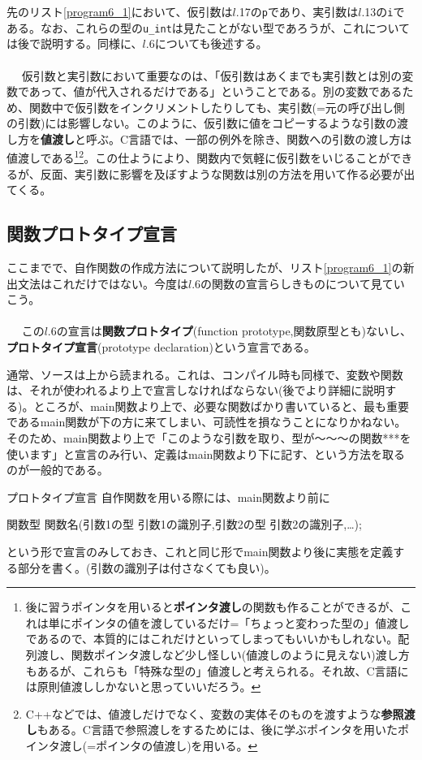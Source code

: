 先のリスト\ref{program6_1}において、仮引数は$l$.17の\verb|p|であり、実引数は$l$.13の\verb|i|である。なお、これらの型の\verb|u_int|は見たことがない型であろうが、これについては後で説明する。同様に、$l$.6についても後述する。
\\ \\　
仮引数と実引数において重要なのは、「仮引数はあくまでも実引数とは別の変数であって、値が代入されるだけである」ということである。別の変数であるため、関数中で仮引数をインクリメントしたりしても、実引数(=元の呼び出し側の引数)には影響しない。このように、仮引数に値をコピーするような引数の渡し方を\textbf{値渡し}と呼ぶ。C言語では、一部の例外を除き、関数への引数の渡し方は値渡しである\footnote{後に習うポインタを用いると\textbf{ポインタ渡し}の関数も作ることができるが、これは単にポインタの値を渡しているだけ=「ちょっと変わった型の」値渡しであるので、本質的にはこれだけといってしまってもいいかもしれない。配列渡し、関数ポインタ渡しなど少し怪しい(値渡しのように見えない)渡し方もあるが、これらも「特殊な型の」値渡しと考えられる。それ故、C言語には原則値渡ししかないと思っていいだろう。}\footnote{C++などでは、値渡しだけでなく、変数の実体そのものを渡すような\textbf{参照渡し}もある。C言語で参照渡しをするためには、後に学ぶポインタを用いたポインタ渡し(=ポインタの値渡し)を用いる。}。この仕ようにより、関数内で気軽に仮引数をいじることができるが、反面、実引数に影響を及ぼすような関数は別の方法を用いて作る必要が出てくる。

\subsection{関数プロトタイプ宣言}
ここまでで、自作関数の作成方法について説明したが、リスト\ref{program6_1}の新出文法はこれだけではない。今度は$l$.6の関数の宣言らしきものについて見ていこう。
\\ \\　
この$l$.6の宣言は\textbf{関数プロトタイプ}(function prototype,関数原型とも)ないし、\textbf{プロトタイプ宣言}(prototype declaration)という宣言である。

通常、ソースは上から読まれる。これは、コンパイル時も同様で、変数や関数は、それが使われるより上で宣言しなければならない(後でより詳細に説明する)。ところが、main関数より上で、必要な関数ばかり書いていると、最も重要であるmain関数が下の方に来てしまい、可読性を損なうことになりかねない。そのため、main関数より上で「このような引数を取り、型が〜〜〜の関数***を使います」と宣言のみ行い、定義はmain関数より下に記す、という方法を取るのが一般的である。
\begin{itembox}[l]{プロトタイプ宣言}
自作関数を用いる際には、main関数より前に
\begin{code}
関数型 関数名(引数1の型 引数1の識別子,引数2の型 引数2の識別子,…);
\end{code}
という形で宣言のみしておき、これと同じ形でmain関数より後に実態を定義する部分を書く。(引数の識別子は付さなくても良い)。
\end{itembox}

